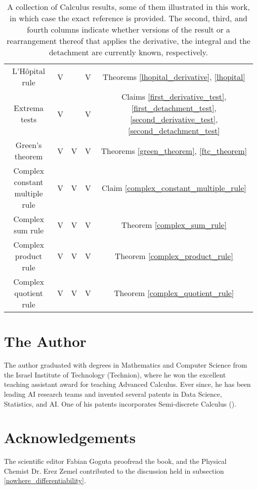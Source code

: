 \documentclass[11pt]{book}
\begin{document}
\begin{table}[h!]
\begin{tabular}{ccccc}
        L'Hôpital rule & \color[HTML]{FFA006} V & & \color[HTML]{0039BD} V & Theorems \ref{lhopital_derivative}, \ref{lhopital} \\
        Extrema tests & \color[HTML]{FFA006} V & & \color[HTML]{0039BD} V & Claims \ref{first_derivative_test}, \ref{first_detachment_test}, \ref{second_derivative_test}, \ref{second_detachment_test} \\
        Green's theorem & \color[HTML]{FFA006} V & \color[HTML]{7800cf} V & \color[HTML]{0039BD} V & Theorems \ref{green_theorem}, \ref{ftc_theorem} \\
        Complex constant multiple rule & \color[HTML]{FFA006} V & \color[HTML]{7800cf} V & \color[HTML]{0039BD} V & Claim \ref{complex_constant_multiple_rule} \\
        Complex sum rule & \color[HTML]{FFA006} V & \color[HTML]{7800cf} V & \color[HTML]{0039BD} V & Theorem \ref{complex_sum_rule} \\
        Complex product rule & \color[HTML]{FFA006} V & \color[HTML]{7800cf} V & \color[HTML]{0039BD} V & Theorem \ref{complex_product_rule} \\
        Complex quotient rule & \color[HTML]{FFA006} V & \color[HTML]{7800cf} V & \color[HTML]{0039BD} V & Theorem \ref{complex_quotient_rule} \\
        \bottomrule
        \end{tabular}
\color{black}
\caption{A collection of Calculus results, some of them illustrated in this work, in which case the exact reference is provided. The second, third, and fourth columns indicate whether versions of the result or a rearrangement thereof that applies the derivative, the integral and the detachment are currently known, respectively.}
\label{results_table}
\end{table}

\section{The Author}
The author graduated with degrees in Mathematics and Computer Science from the Israel Institute of Technology (Technion), where he won the excellent teaching assistant award for teaching Advanced Calculus. Ever since, he has been leading AI research teams and invented several patents in Data Science, Statistics, and AI. One of his patents incorporates Semi-discrete Calculus (\cite{shacharpatent}).


\section{Acknowledgements}
The scientific editor Fabian Goguta proofread the book, and the Physical Chemist Dr. Erez Zemel contributed to the discussion held in subsection \ref{nowhere_differentiability}.
\end{document}
